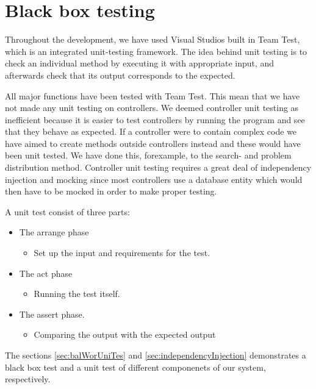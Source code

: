 \chapter{Black box testing}
\label{chap:testing}

Throughout the development, we have used Visual Studios built in Team Test, which is an integrated unit-testing framework. \cite{teamtest} 
The idea behind unit testing is to check an individual method by executing it with appropriate input, and afterwards check that its output corresponds to the expected.

All major functions have been tested with Team Test. This mean that we have not made any unit testing on controllers. We deemed controller unit testing as inefficient because it is easier to test controllers by running the program and see that they behave as expected. If a controller were to contain complex code we have aimed to create methods outside controllers instead and these would have been unit tested. 
We have done this, forexample, to the search- and problem distribution method. 
Controller unit testing requires a great deal of independency injection and mocking since most controllers use a database entity which would then have to be mocked in order to make proper testing.

A unit test consist of three parts:
\begin{itemize}
\item The arrange phase 
	\begin{itemize}
	\item Set up the input and requirements for the test. 
	\end{itemize}
\item The act phase
	\begin{itemize}
	\item Running the test itself.
	\end{itemize}
\item The assert phase.
	\begin{itemize}
	\item Comparing the output with the expected output
	\end{itemize}
\end{itemize}

The sections \ref{sec:balWorUniTes} and \ref{sec:independencyInjection} demonstrates a black box test and a unit test of different componenets of our system, respectively.



